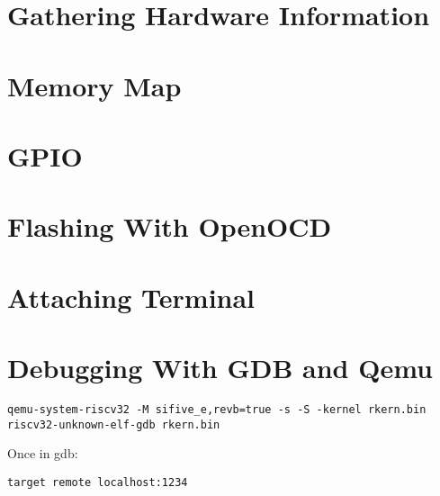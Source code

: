 \documentclass[a4paper,12pt,twoside]{report}
\begin{document}
        \section{Gathering Hardware Information}
            

        \section{Memory Map}
           	

        \section{GPIO}
            

        \section{Flashing With OpenOCD}
            

        \section{Attaching Terminal}
            

        \section{Debugging With GDB and Qemu}
\begin{lstlisting}
qemu-system-riscv32 -M sifive_e,revb=true -s -S -kernel rkern.bin
riscv32-unknown-elf-gdb rkern.bin
\end{lstlisting}

Once in gdb:
\begin{lstlisting}
target remote localhost:1234
\end{lstlisting}

    \printbibliography
\end{document}

